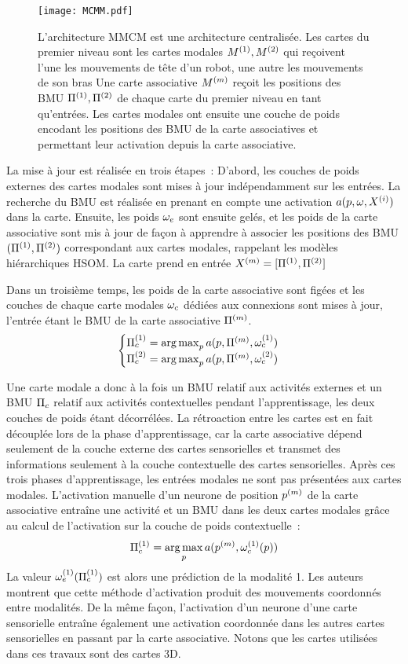 \documentclass[../main]{subfiles}
\begin{document}
\begin{figure}[t]
    \centering
    \texttt{[image: MCMM.pdf]}
    \caption{L'architecture MMCM \parencite{dominey13} est une architecture centralisée.
    Les cartes du premier niveau sont les cartes modales $M^{({1})}, M^{({2})}$ qui reçoivent l'une les mouvements de tête d'un robot, une autre les mouvements de son bras
    Une carte associative $M^{({m})}$ reçoit les positions des BMU $\Pi^{({1})},\Pi^{({2})}$ de chaque carte du premier niveau en tant qu'entrées. 
    Les cartes modales ont ensuite une couche de poids encodant les positions des BMU de la carte associatives et permettant leur activation depuis la carte associative.
    \label{fig:mmcm}}
\end{figure}

La mise à jour est réalisée en trois étapes~: 
D'abord, les couches de poids externes des cartes modales sont mises à jour indépendamment sur les entrées. La recherche du BMU est réalisée en prenant en compte une activation $a(p, \omega, X^{({i})})$ dans la carte.
Ensuite, les poids $\omega_e$ sont ensuite gelés, et les poids de la carte associative sont mis à jour de façon à apprendre à associer les positions des BMU $(\Pi^{({1})},\Pi^{({2})})$ correspondant aux cartes modales, rappelant les modèles hiérarchiques HSOM. La carte prend en entrée $X^{({m})} = [\Pi^{({1})}, \Pi^{({2})}]$

Dans un troisième temps, les poids de la carte associative sont figées et les couches de chaque carte modales $\omega_c$ dédiées aux connexions sont mises à jour, l'entrée étant le BMU de la carte associative $\Pi^{({m})}$.
\begin{equation*}
    \begin{cases}
        \Pi_c^{({1})} = \operatorname*{arg\,max}_p a(p, \Pi^{({m})}, \omega_c^{({1})})\\
        \Pi_c^{({2})} = \operatorname*{arg\,max}_p a(p, \Pi^{({m})}, \omega_c^{({2})})
    \end{cases}
    \end{equation*}

Une carte modale a donc à la fois un BMU relatif aux activités externes et un BMU $\Pi_c$ relatif aux activités contextuelles pendant l'apprentissage, les deux couches de poids étant décorrélées.
La rétroaction entre les cartes est en fait découplée lors de la phase d'apprentissage, car la carte associative dépend seulement de la couche externe des cartes sensorielles et transmet des informations seulement à la couche contextuelle des cartes sensorielles.
Après ces trois phases d'apprentissage, les entrées modales ne sont pas présentées aux cartes modales. L'activation manuelle d'un neurone de position $p^{({m})}$ de la carte associative entraîne une activité et un BMU dans les deux cartes modales grâce au calcul de l'activation sur la couche de poids contextuelle~: 
$$ \Pi_c^{({1})} = \operatorname*{arg\,max}\limits_p a(p^{({m})},\omega_c^{({1})}(p))$$
La valeur $\omega_e^{({1})}(\Pi_c^{({1})})$ est alors une prédiction de la modalité 1.
Les auteurs montrent que cette méthode d'activation produit des mouvements coordonnés entre modalités.
De la même façon, l'activation d'un neurone d'une carte sensorielle entraîne également une activation coordonnée dans les autres cartes sensorielles en passant par la carte associative.
Notons que les cartes utilisées dans ces travaux sont des cartes 3D.
\end{document}
